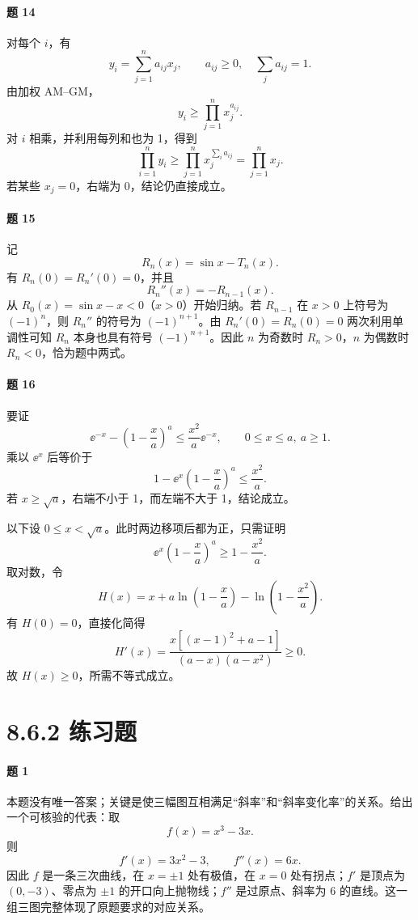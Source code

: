 \paragraph{题 14}
\begin{xsolution}
对每个 $i$，有
\[
  y_i=\sum_{j=1}^n a_{ij}x_j,
  \qquad a_{ij}\ge0,\quad \sum_j a_{ij}=1.
\]
由加权 AM--GM，
\[
  y_i\ge\prod_{j=1}^n x_j^{a_{ij}}.
\]
对 $i$ 相乘，并利用每列和也为 1，得到
\[
  \prod_{i=1}^n y_i
  \ge\prod_{j=1}^n x_j^{\sum_i a_{ij}}
  =\prod_{j=1}^n x_j.
\]
若某些 $x_j=0$，右端为 0，结论仍直接成立。
\end{xsolution}

\paragraph{题 15}
\begin{xsolution}
记
\[
  R_n(x)=\sin x-T_n(x).
\]
有 $R_n(0)=R_n'(0)=0$，并且
\[
  R_n''(x)=-R_{n-1}(x).
\]
从 $R_0(x)=\sin x-x<0$（$x>0$）开始归纳。若 $R_{n-1}$ 在 $x>0$ 上符号为 $(-1)^n$，则 $R_n''$ 的符号为 $(-1)^{n+1}$。由 $R_n'(0)=R_n(0)=0$ 两次利用单调性可知 $R_n$ 本身也具有符号 $(-1)^{n+1}$。因此 $n$ 为奇数时 $R_n>0$，$n$ 为偶数时 $R_n<0$，恰为题中两式。
\end{xsolution}

\paragraph{题 16}
\begin{xsolution}
要证
\[
  \ee^{-x}-\left(1-\frac xa\right)^a
  \le\frac{x^2}{a}\ee^{-x},
  \qquad 0\le x\le a,\ a\ge1.
\]
乘以 $\ee^x$ 后等价于
\[
  1-\ee^x\left(1-\frac xa\right)^a\le\frac{x^2}{a}.
\]
若 $x\ge\sqrt a$，右端不小于 1，而左端不大于 1，结论成立。

以下设 $0\le x<\sqrt a$。此时两边移项后都为正，只需证明
\[
  \ee^x\left(1-\frac xa\right)^a\ge1-\frac{x^2}{a}.
\]
取对数，令
\[
  H(x)=x+a\ln\left(1-\frac xa\right)
       -\ln\left(1-\frac{x^2}{a}\right).
\]
有 $H(0)=0$，直接化简得
\[
  H'(x)=
  \frac{x[(x-1)^2+a-1]}{(a-x)(a-x^2)}\ge0.
\]
故 $H(x)\ge0$，所需不等式成立。
\end{xsolution}

\section*{8.6.2 练习题}

\paragraph{题 1}
\begin{xsolution}
本题没有唯一答案；关键是使三幅图互相满足“斜率”和“斜率变化率”的关系。给出一个可核验的代表：取
\[
  f(x)=x^3-3x.
\]
则
\[
  f'(x)=3x^2-3,
  \qquad
  f''(x)=6x.
\]
因此 $f$ 是一条三次曲线，在 $x=\pm1$ 处有极值，在 $x=0$ 处有拐点；$f'$ 是顶点为 $(0,-3)$、零点为 $\pm1$ 的开口向上抛物线；$f''$ 是过原点、斜率为 6 的直线。这一组三图完整体现了原题要求的对应关系。
\end{xsolution}

